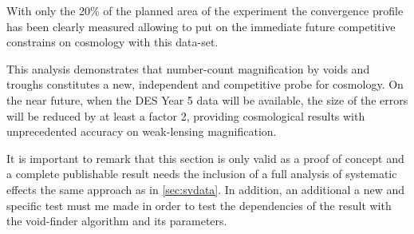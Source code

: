 With only the 20\% of the planned area of the experiment the convergence profile has been clearly measured allowing to put on the immediate future competitive constrains on cosmology with this data-set.
\newline

This analysis demonstrates that number-count magnification by voids and troughs constitutes a new, independent and competitive probe for cosmology. On the near future, when the DES Year 5 data will be available, the size of the errors will be reduced by at least a factor 2, providing cosmological results with unprecedented accuracy on weak-lensing magnification.
\newline

It is important to remark that this section is only valid as a proof of concept and a complete publishable result needs the inclusion of a full analysis of systematic effects the same approach as in \autoref{sec:svdata}. In addition, an additional a new and specific test must me made in order to test the dependencies of the result with the void-finder algorithm and its parameters.

